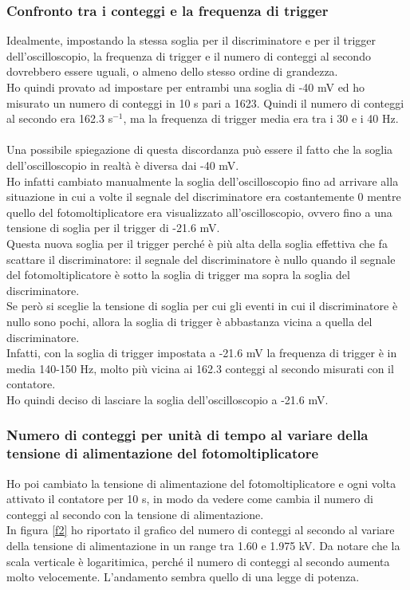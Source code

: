 \documentclass{article}
\begin{document}
\subsubsection{Confronto tra i conteggi e la frequenza di trigger} Idealmente, impostando la stessa soglia per il discriminatore e per il trigger dell'oscilloscopio, la frequenza di trigger e il numero di conteggi al secondo dovrebbero essere uguali, o almeno dello stesso ordine di grandezza. \\
Ho quindi provato ad impostare per entrambi una soglia di -40 mV ed ho misurato un numero di conteggi in 10 s pari a 1623. Quindi il numero di conteggi al secondo era 162.3 s$^{-1}$, ma la frequenza di trigger media era tra i 30 e i 40 Hz. \\
\\
Una possibile spiegazione di questa discordanza può essere il fatto che la soglia dell'oscilloscopio in realtà è diversa dai -40 mV. \\Ho infatti cambiato manualmente la soglia dell'oscilloscopio fino ad arrivare alla situazione in cui a volte il segnale del discriminatore era costantemente 0 mentre quello del fotomoltiplicatore era visualizzato all'oscilloscopio, ovvero fino a una tensione di soglia per il trigger di -21.6 mV. \\ Questa nuova soglia per il trigger perché è più alta della soglia effettiva che fa scattare il discriminatore: il segnale del discriminatore è nullo quando il segnale del fotomoltiplicatore è sotto la soglia di trigger ma sopra la soglia del discriminatore. \\Se però si sceglie la tensione di soglia per cui gli eventi in cui il discriminatore è nullo sono pochi, allora la soglia di trigger è abbastanza vicina a quella del discriminatore.\\
Infatti, con la soglia di trigger impostata a -21.6 mV la frequenza di trigger è in media 140-150 Hz, molto più vicina ai 162.3 conteggi al secondo misurati con il contatore.
\\
Ho quindi deciso di lasciare la soglia dell'oscilloscopio a -21.6 mV.
\subsubsection{Numero di conteggi per unità di tempo al variare della tensione di alimentazione del fotomoltiplicatore}

Ho poi cambiato la tensione di alimentazione del fotomoltiplicatore e ogni volta attivato il contatore per 10 s, in modo da vedere come cambia il numero di conteggi al secondo con la tensione di alimentazione. \\
In figura \ref{f2} ho riportato il grafico del numero di conteggi al secondo al variare della tensione di alimentazione in un range tra 1.60 e 1.975 kV. 
Da notare che la scala verticale è logaritimica, perché il numero di conteggi al secondo aumenta molto velocemente. L'andamento sembra quello di una legge di potenza.
\end{document}
